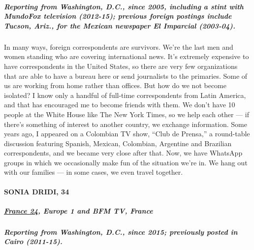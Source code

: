 \hypertarget{reporting-from-washington-dc-since-2005-including-a-stint-with-mundofox-television-2012-15-previous-foreign-postings-include-tucson-ariz-for-the-mexican-newspaper-el-imparcial-2003-04}{%
\subparagraph{\texorpdfstring{\textbf{Reporting from Washington, D.C.,
since 2005, including a stint with MundoFox television (2012-15);
previous foreign postings include Tucson, Ariz., for the Mexican
newspaper El Imparcial
(2003-04).}}{Reporting from Washington, D.C., since 2005, including a stint with MundoFox television (2012-15); previous foreign postings include Tucson, Ariz., for the Mexican newspaper El Imparcial (2003-04).}}\label{reporting-from-washington-dc-since-2005-including-a-stint-with-mundofox-television-2012-15-previous-foreign-postings-include-tucson-ariz-for-the-mexican-newspaper-el-imparcial-2003-04}}

In many ways, foreign correspondents are survivors. We're the last men
and women standing who are covering international news. It's extremely
expensive to have correspondents in the United States, so there are very
few organizations that are able to have a bureau here or send
journalists to the primaries. Some of us are working from home rather
than offices. But how do we not become isolated? I know only a handful
of full-time correspondents from Latin America, and that has encouraged
me to become friends with them. We don't have 10 people at the White
House like The New York Times, so we help each other --- if there's
something of interest to another country, we exchange information. Some
years ago, I appeared on a Colombian TV show, ``Club de Prensa,'' a
round-table discussion featuring Spanish, Mexican, Colombian, Argentine
and Brazilian correspondents, and we became very close after that. Now,
we have WhatsApp groups in which we occasionally make fun of the
situation we're in. We hang out with our families --- in some cases, we
even travel together.

\hypertarget{sonia-dridi-34}{%
\paragraph{SONIA DRIDI, 34}\label{sonia-dridi-34}}

\hypertarget{france-24-europe-1-and-bfm-tv-france}{%
\subparagraph{\texorpdfstring{\href{https://www.france24.com/en/}{France
24}, Europe 1 and BFM TV,
France}{France 24, Europe 1 and BFM TV, France}}\label{france-24-europe-1-and-bfm-tv-france}}

\hypertarget{reporting-from-washington-dc-since-2015-previously-posted-in-cairo-2011-15}{%
\subparagraph{Reporting from Washington, D.C., since 2015; previously
posted in Cairo
(2011-15).}\label{reporting-from-washington-dc-since-2015-previously-posted-in-cairo-2011-15}}

